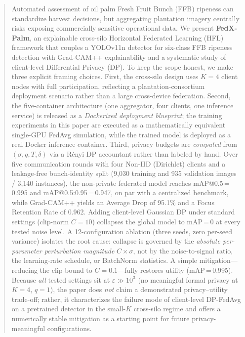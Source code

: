 \documentclass[conference]{IEEEtran}
\begin{document}
\begin{abstract}
Automated assessment of oil palm Fresh Fruit Bunch (FFB) ripeness can
standardize harvest decisions, but aggregating plantation imagery centrally
risks exposing commercially sensitive operational data. We present
\textbf{FedX-Palm}, an explainable cross-silo Horizontal Federated Learning
(HFL) framework that couples a YOLOv11n detector for six-class FFB ripeness
detection with Grad-CAM++ explainability and a systematic study of
client-level Differential Privacy (DP). To keep the scope honest, we make
three explicit framing choices. First, the cross-silo design uses $K{=}4$
client nodes with full participation, reflecting a plantation-consortium
deployment scenario rather than a large cross-device federation. Second, the
five-container architecture (one aggregator, four clients, one inference
service) is released as a \emph{Dockerized deployment blueprint}; the
training experiments in this paper are executed as a mathematically
equivalent single-GPU FedAvg simulation, while the trained model is deployed
as a real Docker inference container. Third, privacy budgets are
\emph{computed} from $(\sigma,q,T,\delta)$ via a Rényi DP accountant rather
than labeled by hand. Over five communication rounds with four Non-IID
(Dirichlet) clients and a leakage-free bunch-identity split (9{,}030 training
and 935 validation images / 3{,}140 instances), the non-private federated
model reaches mAP@0.5\,=\,0.995 and mAP@0.5:0.95\,=\,0.947, on par
with a centralized benchmark, while Grad-CAM++ yields an Average Drop of
95.1\% and a Focus Retention Rate of 0.962. Adding client-level Gaussian DP
under standard settings (clip-norm $C{=}10$) collapses the global model to
mAP\,=\,0 at every tested noise level. A 12-configuration ablation (three
seeds, zero per-seed variance) isolates the root cause: collapse is governed
by the \emph{absolute per-parameter perturbation magnitude}
$C\!\times\!\sigma$, not by the noise-to-signal ratio, the learning-rate
schedule, or BatchNorm statistics. A simple mitigation---reducing the
clip-bound to $C{=}0.1$---fully restores utility (mAP\,=\,0.995). Because
\emph{all} tested settings sit at $\varepsilon\gg 10^{3}$ (no meaningful
formal privacy at $K{=}4$, $q{=}1$), the paper does \emph{not} claim a
demonstrated privacy--utility trade-off; rather, it characterizes the failure
mode of client-level DP-FedAvg on a pretrained detector in the small-$K$
cross-silo regime and offers a numerically stable mitigation as a starting
point for future privacy-meaningful configurations.
\end{abstract}
\end{document}
